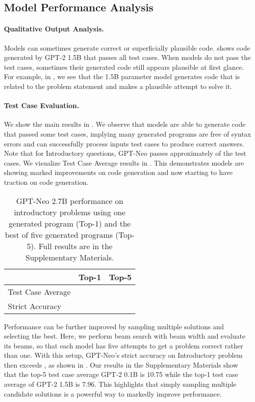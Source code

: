 \documentclass{article}
\begin{document}
\subsection{Model Performance Analysis}

\paragraph{Qualitative Output Analysis.} Models can sometimes generate correct or superficially plausible code.  shows code generated by GPT-2 1.5B that passes all test cases. When models do not pass the test cases, sometimes their generated code still appears plausible at first glance. For example, in , we see that the 1.5B parameter model generates code that is related to the problem statement and makes a plausible attempt to solve it.


\paragraph{Test Case Evaluation.}
We show the main results in . We observe that models are able to generate code that passed some test cases, implying many generated programs are free of syntax errors and can successfully process inputs test cases to produce correct answers. Note that for Introductory questions, GPT-Neo passes approximately  of the test cases. We visualize Test Case Average results in . This demonstrates models are showing marked improvements on code generation and now starting to have traction on code generation.

\begin{wraptable}{r}{0.43\textwidth}
\begin{center}
\begin{tabular}{l|cc}
    & Top-1 & Top-5 \\ \midrule
Test Case Average &  &  \\
Strict Accuracy &  &  \\
\bottomrule
\end{tabular}
\caption{GPT-Neo 2.7B performance on introductory problems using one generated program (Top-1) and the best of five generated programs (Top-5). Full results are in the Supplementary Materials. }
\label{tab:topk}
\end{center}
\end{wraptable}

Performance can be further improved by sampling multiple solutions and selecting the best. Here, we perform beam search with beam width  and evaluate its  beams, so that each model has five attempts to get a problem correct rather than one. With this setup, GPT-Neo's strict accuracy on Introductory problem then exceeds , as shown in . Our results in the Supplementary Materials show that the top-5 test case average GPT-2 0.1B is 10.75 while the top-1 test case average of GPT-2 1.5B is 7.96. This highlights that simply sampling multiple candidate solutions is a powerful way to markedly improve performance.
\end{document}

